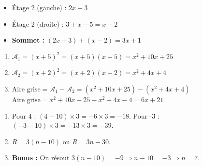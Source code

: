 \documentclass[a4paper]{book}
\begin{document}
    \begin{exercice}
    \begin{itemize}
        \item Étage 2 (gauche) : $2x + 3$
        \item Étage 2 (droite) : $3 + x - 5 = x - 2$
        \item \textbf{Sommet :} $(2x + 3) + (x - 2) = 3x + 1$
    \end{itemize}
    \end{exercice}
    
    \begin{exercice}
    \begin{enumerate}
        \item $\mathcal{A}_1 = (x+5)^2 = (x+5)(x+5) = x^2 + 10x + 25$
        \item $\mathcal{A}_2 = (x+2)^2 = (x+2)(x+2) = x^2 + 4x + 4$
        \item $\text{Aire grise} = \mathcal{A}_1 - \mathcal{A}_2 = (x^2 + 10x + 25) - (x^2 + 4x + 4)$ \\
        $\text{Aire grise} = x^2 + 10x + 25 - x^2 - 4x - 4 = 6x + 21$
    \end{enumerate}
    \end{exercice}
    
    \begin{exercice}
    \begin{enumerate}
        \item Pour 4 : $(4 - 10) \times 3 = -6 \times 3 = -18$. Pour -3 : $(-3 - 10) \times 3 = -13 \times 3 = -39$.
        \item $R = 3(n - 10)$ ou $R = 3n - 30$.
        \item \textbf{Bonus :} On résout $3(n - 10) = -9 \Rightarrow n - 10 = -3 \Rightarrow n = 7$.
    \end{enumerate}
    \end{exercice}
\end{document}
